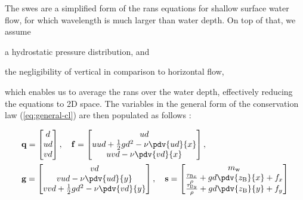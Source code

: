 The \glspl{swe} are a simplified form of the \gls{rans} equations for shallow surface water flow, for which wavelength is much larger than water depth.
On top of that, we assume
\begin{enumerate*}[label=(\roman*)]
	\item a hydrostatic pressure distribution, and
	\item the negligibility of vertical in comparison to horizontal flow,
\end{enumerate*} 
which enables us to average the \gls{rans} over the water depth, effectively reducing the equations to \gls{2D} space.
The variables in the general form of the conservation law (\autoref{eq:general-cl}) are then populated as follows \autocite{simons2020}:

\begin{equation}\label{eq:swe}
	\begin{aligned}
		 & \mathbf{q} = \begin{bmatrix}
			                d  \\
			                ud \\
			                vd
		                \end{bmatrix}, \quad
		\mathbf{f} = \begin{bmatrix}
			             ud                                        \\
			             uud + \frac{1}{2}gd^{2} - \nu \pdv{ud}{x} \\
			             uvd - \nu \pdv{vd}{x}
		             \end{bmatrix}, \quad
		\\
		 & \mathbf{g} = \begin{bmatrix}
			                vd                    \\
			                vud - \nu \pdv{ud}{y} \\
			                vvd + \frac{1}{2}gd^{2} - \nu \pdv{vd}{y}
		                \end{bmatrix}, \quad
		\mathbf{s} = \begin{bmatrix}
			             m_{\mathrm{w}}                                              \\
			             \frac{\tau_{\mathrm{B}x}}{\rho} + gd \pdv{z_{\mathrm{B}}}{x} + f_{x} \\
			             \frac{\tau_{\mathrm{B}y}}{\rho} + gd \pdv{z_{\mathrm{B}}}{y} + f_{y}
		             \end{bmatrix}
	\end{aligned}
\end{equation}

